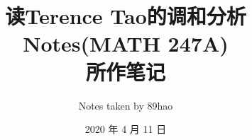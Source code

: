 \documentclass[a4paper,12pt]{article}
\begin{document}
\title{读Terence Tao的调和分析Notes(MATH 247A)\\
 所作笔记\\
}
\author{\large Notes taken by 89hao}
\date{2020 年 4 月 11 日}  
\maketitle
\tableofcontents


%
%
\end{document}
